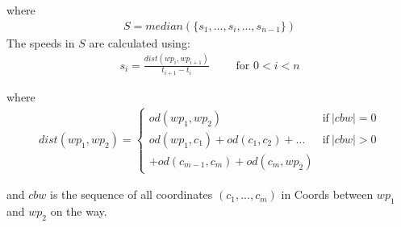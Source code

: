 where
\begin{align*}
S = median(\{s_1,...,s_i,...,s_{n-1}\})
\end{align*}
%
The speeds in $S$ are calculated using:
\begin{align*}
s_i = \frac{dist(wp_i, wp_{i+1})}{t_{i+1} - t_i} \qquad \text{ for } 0 < i < n
\end{align*}

where
\begin{align*}
dist(wp_1, wp_2) = \begin{cases}
od(wp_1, wp_2) & \text{if}\ |cbw| = 0 \\
od(wp_1, c_1) + od(c_1, c_2) + ... & \text{if}\ |cbw| > 0 \\
+ od(c_{m-1}, c_m) + od(c_m, wp_2)
\end{cases}
\end{align*}

and $cbw$ is the sequence of all coordinates $(c_1,...,c_m)$ in Coords between $wp_1$ and $wp_2$ on the way.
